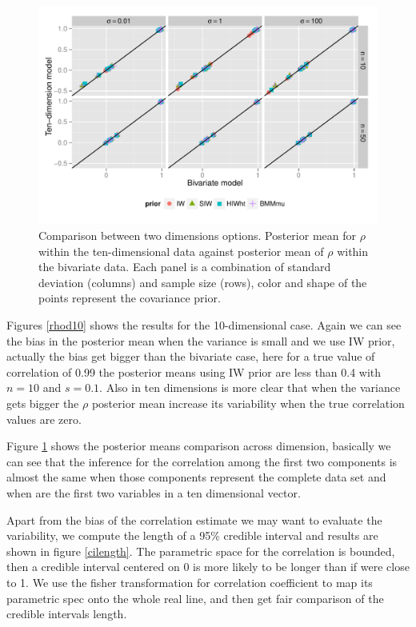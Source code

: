 \documentclass{article}
\begin{document}
\begin{figure}[hbpt]
   \centering
   \includegraphics[width=\textwidth]{fig_d2d10} %
    \vspace{-.5in}
   \caption{ Comparison between two dimensions options. Posterior mean for $\rho$ within the ten-dimensional data against posterior mean of $\rho$ within the bivariate data. Each panel is a combination of standard deviation (columns) and sample size (rows),  color and shape of the points represent the covariance prior.\label{d2d10} }
\end{figure}

Figures \ref{rhod10}  shows the results for the 10-dimensional case. Again we can see the bias in the posterior mean when the variance is small and we use IW prior, actually the bias get bigger than the bivariate case, here for a true value of correlation of 0.99 the posterior means using IW prior are less than 0.4 with  $n=10$ and $s=0.1$. Also in ten dimensions is more clear that when the variance gets bigger the $\rho$ posterior mean increase its variability when the true correlation values are zero.

Figure \ref{d2d10} shows the posterior means comparison across dimension, basically we can see that the inference for the correlation among the first two components is almost the same when those components represent the complete data set and when are the first two variables  in a ten dimensional vector. 

Apart from the bias of the correlation estimate we may want to evaluate the variability, we compute the length of a 95\% credible interval and results are shown in figure \ref{cilength}. The parametric space for the correlation is bounded, then a credible interval centered on 0 is more likely to be longer than if were close to 1. We use the fisher transformation for correlation coefficient to  map its parametric spec onto the whole real line, and then get fair comparison of the credible intervals length. 
\end{document}
